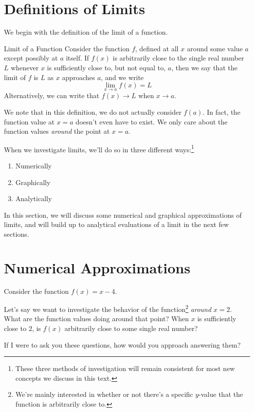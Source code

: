 \section{Definitions of Limits}

We begin with the definition of the limit of a function.

\begin{thm}{Limit of a Function}
  Consider the function $f$, defined at all $x$ around some value $a$ except possibly at $a$ itself.
  If $f(x)$ is arbitrarily close to the single real number $L$ whenever $x$ is sufficiently close to, but not equal to, $a$, then we say that the limit of $f$ is $L$ as $x$ approaches $a$, and we write
  \[\lim_{x\to a} f(x) = L\]
  Alternatively, we can write that $f(x)\to L$ when $x\to a$.
\end{thm}

We note that in this definition, we do not actually consider $f(a)$.
In fact, the function value at $x=a$ doesn't even have to exist.
We only care about the function values \textit{around} the point at $x=a$.

When we investigate limits, we'll do so in three different ways:\footnote{
These three methods of investigation will remain consistent for most new concepts we discuss in this text.}
\begin{enumerate}
  \item Numerically
  \item Graphically
  \item Analytically
\end{enumerate}

In this section, we will discuss some numerical and graphical approximations of limits, and will build up to analytical evaluations of a limit in the next few sections.

\section*{Numerical Approximations}

Consider the function $f(x) = x-4$.

Let's say we want to investigate the behavior of the function\footnote{We're mainly interested in whether or not there's a specific $y$-value that the function is arbitrarily close to.} \textit{around} $x=2$.
What are the function values doing around that point?
When $x$ is sufficiently close to $2$, is $f(x)$ arbitrarily close to some single real number?

If I were to ask you these questions, how would you approach answering them?

